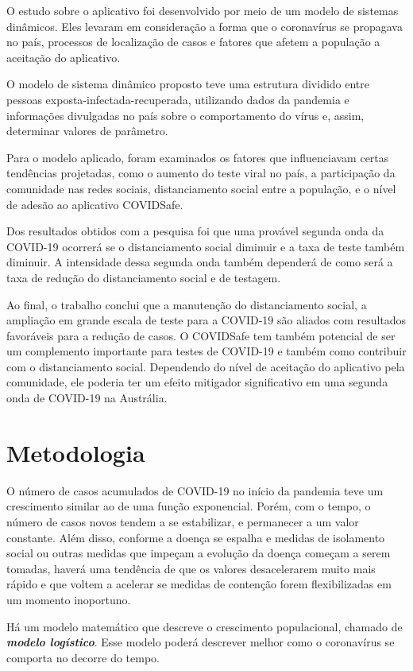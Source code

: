 \documentclass{article}
\begin{document}
O estudo sobre o aplicativo foi desenvolvido por meio de um modelo de sistemas dinâmicos. Eles levaram em consideração a forma que o coronavírus se propagava no país, processos de localização de casos e fatores que afetem a população a aceitação do aplicativo. 

O modelo de sistema dinâmico proposto 
teve uma estrutura dividido entre pessoas exposta-infectada-recuperada, utilizando dados da pandemia e informações divulgadas no país sobre o comportamento do vírus e, assim, determinar
valores de parâmetro. 

Para o modelo aplicado, foram examinados os fatores que influenciavam certas tendências projetadas, como o aumento do teste viral no país, a participação da comunidade nas redes sociais, 
distanciamento social entre a população, e o nível de adesão ao aplicativo COVIDSafe.

Dos resultados obtidos com a pesquisa foi que uma provável segunda onda da COVID-19 ocorrerá se o distanciamento social diminuir e a taxa de teste também diminuir. A intensidade dessa segunda onda também dependerá de como será a taxa de redução do distanciamento social e de testagem. 

Ao final, o trabalho conclui que a manutenção do distanciamento social, a ampliação em grande escala de teste para a COVID-19 são aliados com resultados favoráveis para a redução de casos. O COVIDSafe tem também potencial de ser um complemento importante para testes de COVID-19 e também como contribuir com o distanciamento social. Dependendo do nível de aceitação do aplicativo pela comunidade, ele poderia ter
um efeito mitigador significativo em uma segunda onda de COVID-19 na Austrália.

\section{Metodologia}
O número de casos acumulados de COVID-19 no início da pandemia teve um crescimento similar ao de uma função exponencial. Porém, com o tempo, o número de casos novos tendem a se estabilizar, e permanecer a um valor constante. Além disso, conforme a doença se espalha e medidas de isolamento social ou outras medidas que impeçam a evolução da doença começam a serem tomadas, haverá uma tendência de que os valores desacelerarem muito mais rápido e que voltem a acelerar se medidas de contenção forem flexibilizadas em um momento inoportuno.

Há um modelo matemático que descreve o crescimento populacional, chamado de \textit{\textbf{modelo logístico}}. Esse modelo poderá descrever melhor como o coronavírus se comporta no decorre do tempo. 
\end{document}
